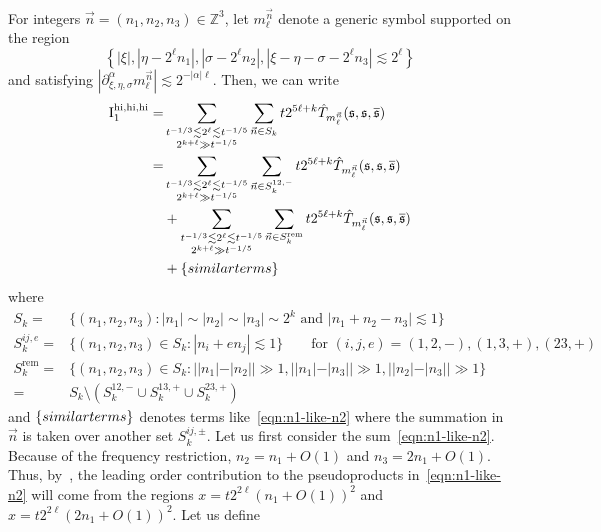 \documentclass[letterpaper, reqno,final]{amsart}
\newcommand{\bbZ}{\mathbb{Z}}
\newcommand{\fs}{\mathfrak{s}}
\newcommand{\rmI}{\mathrm{I}}
\newcommand{\btext}[1]{\left\{\textup{#1}\right\}}
\newcommand{\bsim}{\btext{similar terms}}
\begin{document}
For integers $\vec{n} = (n_1, n_2, n_3) \in \bbZ^3$, let $m^{\vec{n}}_{\ell}$ denote a generic symbol supported on the region
\begin{equation*}
    \left\{|\xi|, |\eta - 2^\ell n_1|, |\sigma - 2^\ell n_2|, |\xi - \eta - \sigma - 2^\ell n_3| \lesssim 2^\ell\right\}
\end{equation*} 
and satisfying $|\partial_{\xi,\eta,\sigma}^\alpha m^{\vec{n}}_{\ell}| \lesssim 2^{-|\alpha| \ell}$.  Then, we can write
\begin{subequations}\begin{align}
    \rmI_1^{\text{hi,hi,hi}} =& \sum_{\crampedsubstack{t^{-1/3} \lesssim 2^{\ell} \lesssim t^{-1/5}\\2^{k+\ell} \gg t^{-1/5}}}\sum_{\vec{n} \in S_k}t 2^{5\ell+k} \hat{T}_{m^{\vec{n}}_{\ell}}(\fs, \fs, \overline{\fs})\notag\\
    =& \sum_{\crampedsubstack{t^{-1/3} \lesssim 2^{\ell} \lesssim t^{-1/5}\\2^{k+\ell} \gg t^{-1/5}}}\sum_{\vec{n} \in S_k^{12,-}}t 2^{5\ell+k} \hat{T}_{m^{\vec{n}}_{\ell}}(\fs, \fs, \overline{\fs}) \label{eqn:n1-like-n2}\\
    &+ \sum_{\crampedsubstack{t^{-1/3} \lesssim 2^{\ell} \lesssim t^{-1/5}\\2^{k+\ell} \gg t^{-1/5}}}\sum_{\vec{n} \in S_k^{\text{rem}}}t 2^{5\ell+k} \hat{T}_{m^{\vec{n}}_{\ell}}(\fs, \fs, \overline{\fs})\label{eqn:all-n-different}\\
    &+\bsim\notag
\end{align}\end{subequations}
where
\begin{equation*}\begin{split}
    S_k =& \{(n_1, n_2, n_3) : |n_1| \sim |n_2| \sim |n_3| \sim 2^k \text{ and } |n_1 + n_2 - n_3| \lesssim 1\}\\
    S_k^{ij,e} =& \{(n_1, n_2, n_3) \in S_k : |n_i +e n_j| \lesssim 1\}\qquad \text{for } (i,j,e) = (1,2,-), (1,3,+), (23,+)\\
    S_k^{\text{rem}} =& \{(n_1, n_2, n_3) \in S_k : ||n_1| - |n_2|| \gg 1, ||n_1| - |n_3|| \gg 1, ||n_2| - |n_3|| \gg 1\}\\
    =& S_k \setminus \left( S_k^{12,-} \cup S_k^{13,+} \cup S_k^{23,+}\right)
\end{split}\end{equation*}
and $\bsim$ denotes terms like~\eqref{eqn:n1-like-n2} where the summation in $\vec{n}$ is taken over another set $S_k^{ij,\pm}$.  Let us first consider the sum~\eqref{eqn:n1-like-n2}.  Because of the frequency restriction, $n_2 = n_1 + O(1)$ and $n_3 = 2 n_1 + O(1)$.  Thus, by~, the leading order contribution to the pseudoproducts in~\eqref{eqn:n1-like-n2} will come from the regions $x = t 2^{2\ell} (n_1 + O(1))^2$ and $x = t2^{2\ell}(2n_1 + O(1))^2$.  Let us define
\end{document}
